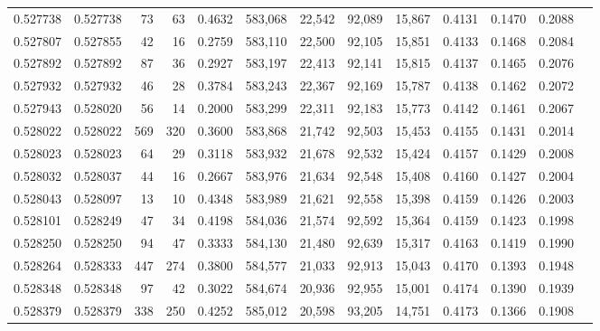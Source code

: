\begin{tabular}{rrrrrrrrrrrrr}
0.527738 & 0.527738 &    73 &    63 &                                     0.4632 & 583,068 &  22,542 &  92,089 &  15,867 & 0.4131 & 0.1470 & 0.2088 \\
0.527807 & 0.527855 &    42 &    16 &                                     0.2759 & 583,110 &  22,500 &  92,105 &  15,851 & 0.4133 & 0.1468 & 0.2084 \\
0.527892 & 0.527892 &    87 &    36 &                                     0.2927 & 583,197 &  22,413 &  92,141 &  15,815 & 0.4137 & 0.1465 & 0.2076 \\
0.527932 & 0.527932 &    46 &    28 &                                     0.3784 & 583,243 &  22,367 &  92,169 &  15,787 & 0.4138 & 0.1462 & 0.2072 \\
0.527943 & 0.528020 &    56 &    14 &                                     0.2000 & 583,299 &  22,311 &  92,183 &  15,773 & 0.4142 & 0.1461 & 0.2067 \\
0.528022 & 0.528022 &   569 &   320 &                                     0.3600 & 583,868 &  21,742 &  92,503 &  15,453 & 0.4155 & 0.1431 & 0.2014 \\
0.528023 & 0.528023 &    64 &    29 &                                     0.3118 & 583,932 &  21,678 &  92,532 &  15,424 & 0.4157 & 0.1429 & 0.2008 \\
0.528032 & 0.528037 &    44 &    16 &                                     0.2667 & 583,976 &  21,634 &  92,548 &  15,408 & 0.4160 & 0.1427 & 0.2004 \\
0.528043 & 0.528097 &    13 &    10 &                                     0.4348 & 583,989 &  21,621 &  92,558 &  15,398 & 0.4159 & 0.1426 & 0.2003 \\
0.528101 & 0.528249 &    47 &    34 &                                     0.4198 & 584,036 &  21,574 &  92,592 &  15,364 & 0.4159 & 0.1423 & 0.1998 \\
0.528250 & 0.528250 &    94 &    47 &                                     0.3333 & 584,130 &  21,480 &  92,639 &  15,317 & 0.4163 & 0.1419 & 0.1990 \\
0.528264 & 0.528333 &   447 &   274 &                                     0.3800 & 584,577 &  21,033 &  92,913 &  15,043 & 0.4170 & 0.1393 & 0.1948 \\
0.528348 & 0.528348 &    97 &    42 &                                     0.3022 & 584,674 &  20,936 &  92,955 &  15,001 & 0.4174 & 0.1390 & 0.1939 \\
0.528379 & 0.528379 &   338 &   250 &                                     0.4252 & 585,012 &  20,598 &  93,205 &  14,751 & 0.4173 & 0.1366 & 0.1908 \\

\end{tabular}
